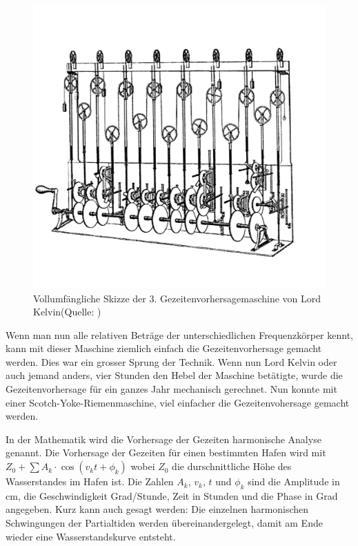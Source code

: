 \begin{figure}
	\centering
	\includegraphics[width=\textwidth]{"papers/gezeiten/Thompson Skizze"}
	\caption{Vollumfängliche Skizze der 3. Gezeitenvorhersagemaschine von
		Lord Kelvin(Quelle: \cite{gezeiten:Thompson})
	\label{fig:thompson-skizze}}
\end{figure}

Wenn man nun alle relativen Beträge der unterschiedlichen Frequenzkörper kennt, kann mit dieser Maschine ziemlich einfach die Gezeitenvorhersage gemacht werden.
Dies war ein grosser Sprung der Technik.
Wenn nun Lord Kelvin oder auch jemand anders, vier Stunden den Hebel der Maschine betätigte, wurde die Gezeitenvorhersage für ein ganzes Jahr mechanisch gerechnet.
Nun konnte mit einer Scotch-Yoke-Riemenmaschine, viel einfacher die Gezeitenvohersage gemacht werden.

In der Mathematik wird die Vorhersage der Gezeiten harmonische Analyse genannt.
Die Vorhersage der Gezeiten für einen bestimmten Hafen wird mit $Z_0+\sum A_k\cdot\cos(v_kt+\phi_k)$ wobei $Z_0$ die durschnittliche Höhe des Wasserstandes im Hafen ist. Die Zahlen $A_k$, $v_k$, $t$ und $\phi_k$ sind die Amplitude in cm, die Geschwindigkeit Grad/Stunde, Zeit in Stunden und die Phase in Grad angegeben.
Kurz kann auch gesagt werden: Die einzelnen harmonischen Schwingungen der Partialtiden werden übereinandergelegt, damit am Ende wieder eine Wasserstandskurve entsteht.

